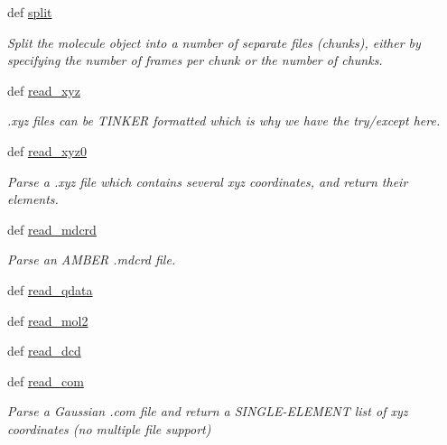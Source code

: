 \begin{DoxyCompactItemize}
def \hyperlink{classforcebalance_1_1molecule_1_1Molecule_a71da1c1e530afd8b9b5f08d9bd27259f}{split}
\begin{DoxyCompactList}\small\item\em Split the molecule object into a number of separate files (chunks), either by specifying the number of frames per chunk or the number of chunks. \end{DoxyCompactList}\item 
def \hyperlink{classforcebalance_1_1molecule_1_1Molecule_a15a7a0e0377e6dfd52e60c77fbc583c1}{read\-\_\-xyz}
\begin{DoxyCompactList}\small\item\em .xyz files can be T\-I\-N\-K\-E\-R formatted which is why we have the try/except here. \end{DoxyCompactList}\item 
def \hyperlink{classforcebalance_1_1molecule_1_1Molecule_aff79ac248e1f0cfe92b5b9e0b559f56e}{read\-\_\-xyz0}
\begin{DoxyCompactList}\small\item\em Parse a .xyz file which contains several xyz coordinates, and return their elements. \end{DoxyCompactList}\item 
def \hyperlink{classforcebalance_1_1molecule_1_1Molecule_ab1b56d66b7673b2631e2cee013a80b93}{read\-\_\-mdcrd}
\begin{DoxyCompactList}\small\item\em Parse an A\-M\-B\-E\-R .mdcrd file. \end{DoxyCompactList}\item 
def \hyperlink{classforcebalance_1_1molecule_1_1Molecule_a1d34af6a7d22dd34850d58efe8595b20}{read\-\_\-qdata}
\item 
def \hyperlink{classforcebalance_1_1molecule_1_1Molecule_a14b1fbc70a083d21fd016b5dd854fd56}{read\-\_\-mol2}
\item 
def \hyperlink{classforcebalance_1_1molecule_1_1Molecule_ad8fa6cc7424aae00ee3f5bb87d28e037}{read\-\_\-dcd}
\item 
def \hyperlink{classforcebalance_1_1molecule_1_1Molecule_a861feda06e1f60ab25c45eaaaf228cfc}{read\-\_\-com}
\begin{DoxyCompactList}\small\item\em Parse a Gaussian .com file and return a S\-I\-N\-G\-L\-E-\/\-E\-L\-E\-M\-E\-N\-T list of xyz coordinates (no multiple file support) \end{DoxyCompactList}\item 

\end{DoxyCompactItemize}
